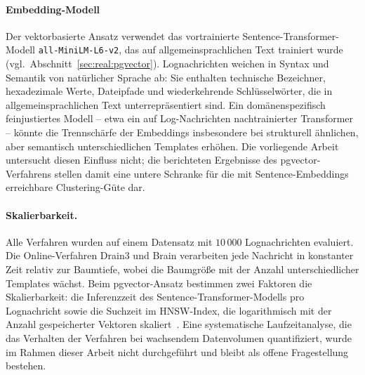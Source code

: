\paragraph{Embedding-Modell}
Der vektorbasierte Ansatz verwendet das vortrainierte Sentence-Transformer-Modell \texttt{all-MiniLM-L6-v2}, das auf allgemeinsprachlichen Text trainiert wurde (vgl.\ Abschnitt~\ref{sec:real:pgvector}). Lognachrichten weichen in Syntax und Semantik von natürlicher Sprache ab: Sie enthalten technische Bezeichner, hexadezimale Werte, Dateipfade und wiederkehrende Schlüsselwörter, die in allgemeinsprachlichen Text unterrepräsentiert sind. Ein domänenspezifisch feinjustiertes Modell -- etwa ein auf Log-Nachrichten nachtrainierter Transformer -- könnte die Trennschärfe der Embeddings insbesondere bei strukturell ähnlichen, aber semantisch unterschiedlichen Templates erhöhen. Die vorliegende Arbeit untersucht diesen Einfluss nicht; die berichteten Ergebnisse des pgvector-Verfahrens stellen damit eine untere Schranke für die mit Sentence-Embeddings erreichbare Clustering-Güte dar.

\paragraph{Skalierbarkeit.}
Alle Verfahren wurden auf einem Datensatz mit $10\,000$ Lognachrichten evaluiert. Die Online-Verfahren Drain3 und Brain verarbeiten jede Nachricht in konstanter Zeit relativ zur Baumtiefe, wobei die Baumgröße mit der Anzahl unterschiedlicher Templates wächst. Beim pgvector-Ansatz bestimmen zwei Faktoren die Skalierbarkeit: die Inferenzzeit des Sentence-Transformer-Modells pro Lognachricht sowie die Suchzeit im HNSW-Index, die logarithmisch mit der Anzahl gespeicherter Vektoren skaliert~\cite{githubGitHubPgvectorpgvector}. Eine systematische Laufzeitanalyse, die das Verhalten der Verfahren bei wachsendem Datenvolumen quantifiziert, wurde im Rahmen dieser Arbeit nicht durchgeführt und bleibt als offene Fragestellung bestehen.


